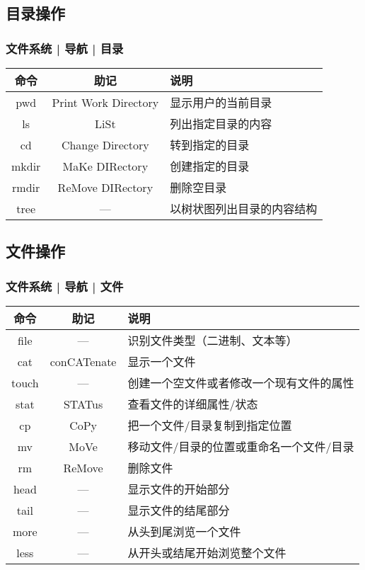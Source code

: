 \subsection{目录操作}
\begin{frame}
  \frametitle{文件系统 | 导航 | \alert{目录}}
  \begin{table}
    \centering
    \begin{tabular}{ccl}
      \hline
      \rowcolor{blue!50}命令 & 助记 & 说明\\
      \hline
      pwd & Print Work Directory & 显示用户的当前目录\\
      ls & LiSt & 列出指定目录的内容\\
      cd & Change Directory & 转到指定的目录\\
      mkdir & MaKe DIRectory & 创建指定的目录\\
      rmdir & ReMove DIRectory & 删除空目录\\
      tree & --- & 以树状图列出目录的内容结构\\
      \hline
    \end{tabular}
  \end{table}
\end{frame}

\subsection{文件操作}
\begin{frame}
  \frametitle{文件系统 | 导航 | \alert{文件}}
  \begin{table}
    \centering
    \begin{tabularx}{0.9\textwidth}{ccX}
      \hline
      \rowcolor{blue!50}命令 & 助记 & 说明\\
      \hline
      file & --- & 识别文件类型（二进制、文本等）\\
      cat & conCATenate & 显示一个文件\\
      touch & --- & 创建一个空文件或者修改一个现有文件的属性\\
      stat & STATus & 查看文件的详细属性/状态\\
      cp & CoPy & 把一个文件/目录复制到指定位置\\
      mv & MoVe & 移动文件/目录的位置或重命名一个文件/目录\\
      rm & ReMove & 删除文件\\
      head & --- & 显示文件的开始部分\\
      tail & --- & 显示文件的结尾部分\\
      more & --- & 从头到尾浏览一个文件\\
      less & --- & 从开头或结尾开始浏览整个文件\\
      \hline
    \end{tabularx}
  \end{table}
\end{frame}

